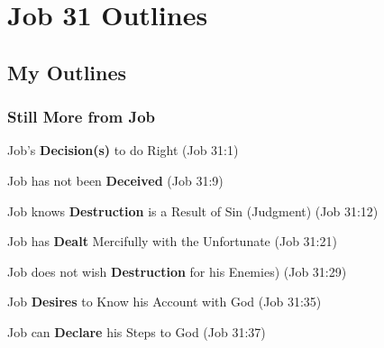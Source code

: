 \section{Job 31 Outlines}

\subsection{My Outlines}

\subsubsection{Still More from Job}

\begin{compactenum}[I.]
    \item Job's \textbf{Decision(s)} to do Right (Job 31:1)
    \item Job has not been \textbf{Deceived}  (Job 31:9)
    \item Job knows \textbf{Destruction} is a Result of Sin (Judgment) (Job 31:12)
    \item Job has \textbf{Dealt} Mercifully with the Unfortunate (Job 31:21)
    \item Job does not wish \textbf{Destruction} for his Enemies) (Job 31:29)
    \item Job \textbf{Desires} to Know his Account with God (Job 31:35)
    \item Job can \textbf{Declare} his Steps to God (Job 31:37)
\end{compactenum}

